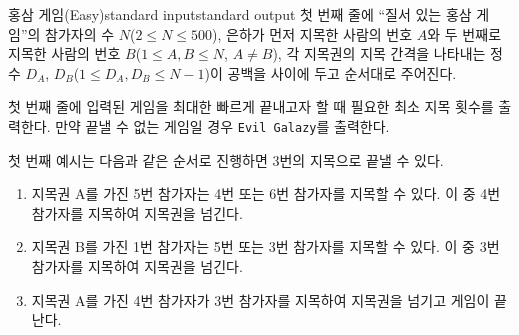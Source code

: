 \begin{problem}{홍삼 게임(Easy)}{standard input}{standard output}
\InputFile
첫 번째 줄에 ``질서 있는 홍삼 게임''의 참가자의 수 $N$($2 \le N \le 500$), 은하가 먼저 지목한 사람의 번호 $A$와 두 번째로 지목한 사람의 번호 $B$($1 \le A, B \le N$, $A \neq B$), 각 지목권의 지목 간격을 나타내는 정수 $D_{A}$, $D_{B}$($1 \le D_{A}, D_{B} \le N-1$)이 공백을 사이에 두고 순서대로 주어진다.

\OutputFile
첫 번째 줄에 입력된 게임을 최대한 빠르게 끝내고자 할 때 필요한 최소 지목 횟수를 출력한다. 만약 끝낼 수 없는 게임일 경우 \texttt{Evil Galazy}를 출력한다.

\Example

\begin{example}
%
%
\end{example}

\Notes

첫 번째 예시는 다음과 같은 순서로 진행하면 3번의 지목으로 끝낼 수 있다.

\begin{enumerate}
\item{지목권 A를 가진 5번 참가자는 4번 또는 6번 참가자를 지목할 수 있다. 이 중 4번 참가자를 지목하여 지목권을 넘긴다.}
\item{지목권 B를 가진 1번 참가자는 5번 또는 3번 참가자를 지목할 수 있다. 이 중 3번 참가자를 지목하여 지목권을 넘긴다.}
\item{지목권 A를 가진 4번 참가자가 3번 참가자를 지목하여 지목권을 넘기고 게임이 끝난다.}
\end{enumerate}

\end{problem}
